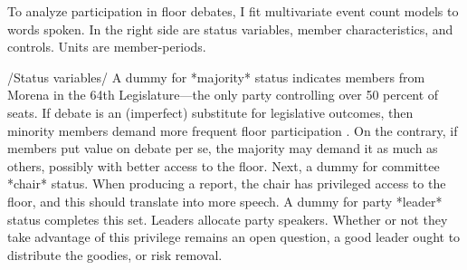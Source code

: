 \documentclass[letter,12pt]{article}
\begin{document}









To analyze participation in floor debates, I fit multivariate event count models to words spoken. In the right side are status variables, member characteristics, and controls. Units are member-periods. 

/Status variables/ A dummy for *majority* status indicates members from Morena in the 64th Legislature---the only party controlling over 50 percent of seats. If debate is an (imperfect) substitute for legislative outcomes, then minority members demand more frequent floor participation \citep{proksch-slapin2015book}. On the contrary, if members put value on debate per se, the majority may demand it as much as others, possibly with better access to the floor. Next, a dummy for committee *chair* status. When producing a report, the chair has privileged access to the floor, and this should translate into more speech. A dummy for party *leader* status completes this set. Leaders allocate party speakers. Whether or not they take advantage of this privilege remains an open question, a good leader ought to distribute the goodies, or risk removal. 
\end{document}
